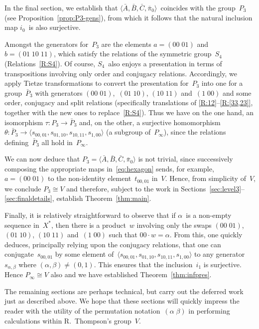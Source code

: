 \documentclass[a4paper,11pt]{article}
\numberwithin{equation}{section}
\newcommand{\swap}[2]{(#1\;#2)}
\begin{document}
In the final section, we establish that $\langle
\bar{A},\bar{B},\bar{C},\bar{\pi}_{0} \rangle$~coincides with the
group~$P_{3}$ (see Proposition~\ref{prop:P3-gens}), from which it
follows that the natural inclusion map $i_{0}$~is also surjective.

Amongst the generators for~$P_{3}$ are the elements $a =
\swap{00}{01}$ and $b = (01 \; 10 \; 11)$, which satisfy the relations
of the symmetric group~$S_{4}$ (Relations~\ref{R:S4}).  Of course,
$S_{4}$~also enjoys a presentation in terms of transpositions
involving only order and conjugacy relations.  Accordingly, we apply
Tietze transformations to convert the presentation for~$P_{3}$ into
one for a group~$\bar{P}_{3}$ with generators
$\swap{00}{01}$,~$\swap{01}{10}$, $\swap{10}{11}$ and~$\swap{1}{00}$
and some order, conjugacy and split relations (specifically
translations of \ref{R:12}--\ref{R:[33,23]}, together with the new
ones to replace~\ref{R:S4}).  Thus we have on the one hand, an
isomorphism $\tau \colon P_{3} \to \bar{P}_{3}$ and, on the other, a
surjective homomorphism $\theta \colon \bar{P}_{3} \to \langle
s_{00,01}, s_{01,10}, s_{10,11}, s_{1,00} \rangle$ (a subgroup
of~$P_{\infty}$), since the relations defining~$\bar{P}_{3}$ all hold
in~$P_{\infty}$.

We can now deduce that $P_{3} = \langle
\bar{A},\bar{B},\bar{C},\bar{\pi}_{0} \rangle$ is not trivial, since
successively composing the appropriate maps in~\eqref{eq:hexagon}
sends, for example, $a = \swap{00}{01}$ to the non-identity
element~$t_{00,01}$ in~$V$.  Hence, from simplicity of~$V$, we
conclude $P_{3} \cong V$ and therefore, subject to the work in
Sections~\ref{sec:level3}--\ref{sec:finaldetails}, establish
Theorem~\ref{thm:main}.

Finally, it is relatively straightforward to observe that if
$\alpha$~is a non-empty sequence in~$X^{\ast}$, then there is a
product~$w$ involving only the swaps $\swap{00}{01}$,~$\swap{01}{10}$,
$\swap{10}{11}$ and~$\swap{1}{00}$ such that $00 \cdot w = \alpha$.
From this, one quickly deduces, principally relying upon the conjugacy
relations, that one can conjugate~$s_{00,01}$ by some element
of~$\langle s_{00,01}, s_{01,10}, s_{10,11}, s_{1,00} \rangle$ to any
generator~$s_{\alpha,\beta}$ where $(\alpha,\beta) \neq (0,1)$.  This
ensures that the inclusion~$i_{1}$ is surjective.  Hence $P_{\infty}
\cong V$ also and we have established Theorem~\ref{thm:infpres}.

The remaining sections are perhaps technical, but carry out the
deferred work just as described above.  We hope that these sections
will quickly impress the reader with the utility of the permutation
notation~$\swap{\alpha}{\beta}$ in performing calculations within
R.~Thompson's group~$V$.
\end{document}
